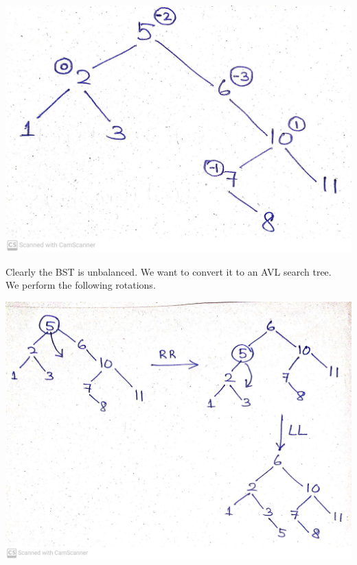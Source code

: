 \documentclass[10pt, a4paper]{extarticle}
\theoremstyle{definition}
\begin{document}
\begin{center}
	\includegraphics[scale=0.1]{balance1.jpg}\\
\end{center}
Clearly the BST is unbalanced. We want to convert it to an AVL search tree.\\
We perform the following rotations.
\begin{center}
	\includegraphics[scale=0.14]{balance2.jpg}\\
\end{center}
\end{document}
